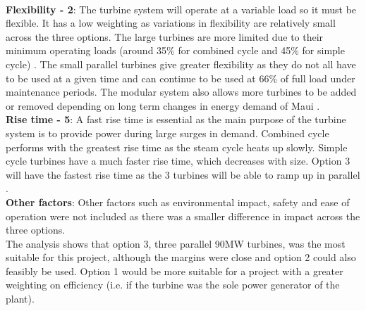 \\\textbf{Flexibility - 2}: The turbine system will operate at a variable load so it must be flexible. It has a low weighting as variations in flexibility are relatively small across the three options. The large turbines are more limited due to their minimum operating loads (around 35\% for combined cycle and 45\% for simple cycle) \cite{!!}. The small parallel turbines give greater flexibility as they do not all have to be used at a given time and can continue to be used at 66\% of full load under maintenance periods. The modular system also allows more turbines to be added or removed depending on long term changes in energy demand of Maui \cite{website:multipleunits}.
\\\textbf{Rise time - 5}: A fast rise time is essential as the main purpose of the turbine system is to provide power during large surges in demand. Combined cycle performs with the greatest rise time as the steam cycle heats up slowly. Simple cycle turbines have a much faster rise time, which decreases with size. Option 3 will have the fastest rise time as the 3 turbines will be able to ramp up in parallel \cite{website:multipleunits}. 
\\\textbf{Other factors}: Other factors such as environmental impact, safety and ease of operation were not included as there was a smaller difference in impact across the three options.\\

The analysis shows that option 3, three parallel 90MW turbines, was the most suitable for this project, although the margins were close and option 2 could also feasibly be used. Option 1 would be more suitable for a project with a greater weighting on efficiency (i.e. if the turbine was the sole power generator of the plant).

